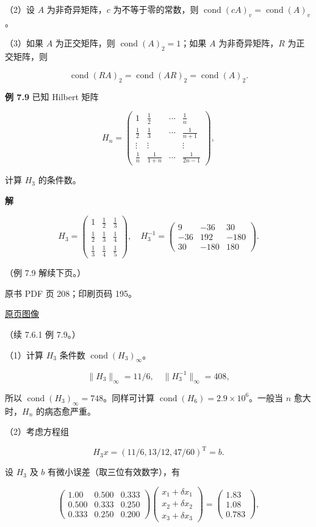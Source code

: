（2）设 \(A\) 为非奇异矩阵，\(c\) 为不等于零的常数，则 \(\operatorname{cond}(cA)_v=\operatorname{cond}(A)_v\)。

（3）如果 \(A\) 为正交矩阵，则 \(\operatorname{cond}(A)_2=1\)；如果 \(A\) 为非奇异矩阵，\(R\) 为正交矩阵，则

\[
\operatorname{cond}(RA)_2=\operatorname{cond}(AR)_2=\operatorname{cond}(A)_2.
\]

\textbf{例 7.9} 已知 Hilbert 矩阵

\[
H_n=\begin{pmatrix}
1&\frac12&\cdots&\frac1n\\[4pt]
\frac12&\frac13&\cdots&\frac1{n+1}\\
\vdots&\vdots&&\vdots\\
\frac1n&\frac1{1+n}&\cdots&\frac1{2n-1}
\end{pmatrix},
\]

计算 \(H_3\) 的条件数。

\textbf{解}

\[
H_3=\begin{pmatrix}
1&\frac12&\frac13\\[4pt]
\frac12&\frac13&\frac14\\[4pt]
\frac13&\frac14&\frac15
\end{pmatrix},\quad
H_3^{-1}=\begin{pmatrix}
9&-36&30\\
-36&192&-180\\
30&-180&180
\end{pmatrix}.
\]

（例 7.9 解续下页。）

\clearpage

原书 PDF 页 208；印刷页码 195。

\href{source-images/pdf-208.jpeg}{原页图像}

（续 7.6.1 例 7.9。）

（1）计算 \(H_3\) 条件数 \(\operatorname{cond}(H_3)_\infty\)。

\[
\|H_3\|_\infty=11/6,\quad\|H_3^{-1}\|_\infty=408,
\]

所以 \(\operatorname{cond}(H_3)_\infty=748\)。同样可计算 \(\operatorname{cond}(H_6)=2.9\times10^6\)。一般当 \(n\) 愈大时，\(H_n\) 的病态愈严重。

（2）考虑方程组

\[
H_3x=(11/6,13/12,47/60)^{\mathrm T}=b.
\]

设 \(H_3\) 及 \(b\) 有微小误差（取三位有效数字），有

\[
\begin{pmatrix}
1.00&0.500&0.333\\
0.500&0.333&0.250\\
0.333&0.250&0.200
\end{pmatrix}
\begin{pmatrix}x_1+\delta x_1\\x_2+\delta x_2\\x_3+\delta x_3\end{pmatrix}
=\begin{pmatrix}1.83\\1.08\\0.783\end{pmatrix},
\tag{7.6.8}
\]

